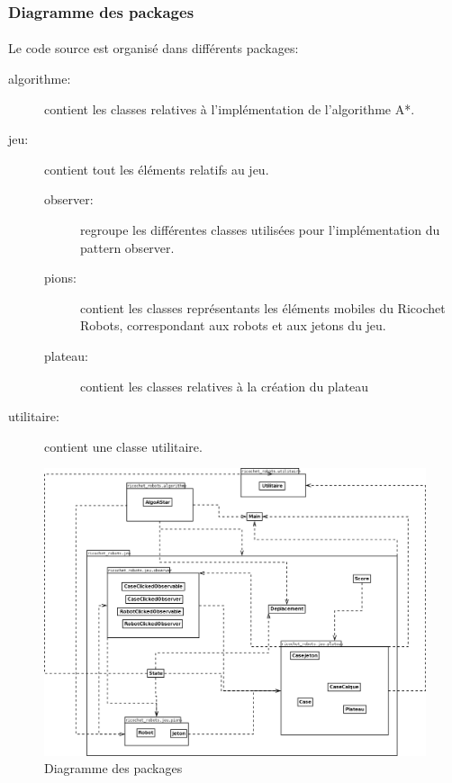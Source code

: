 \documentclass[a4paper, 12pt]{article}
\begin{document}
        \subsubsection{Diagramme des packages}
            
            \paragraph{}
             Le code source est organisé dans différents packages:
             
            \begin{description}
            \item[algorithme:] contient les classes relatives à l'implémentation de l'algorithme A*.
                 \item[jeu:] contient tout les éléments relatifs au jeu.
                 \begin{description}
            	    \item[observer:] regroupe les différentes classes utilisées pour l'implémentation du pattern observer.
            	    \item[pions:] contient les classes représentants les éléments mobiles du Ricochet Robots, correspondant aux robots et aux jetons du jeu.  
            	    \item[plateau:] contient les classes relatives à la création du plateau
        	    \end{description}
                 \item[utilitaire:] contient une classe utilitaire.
             \end{description}
             
            \begin{figure}[H]
                \centering
                \includegraphics[scale=0.3]{images/diagrammePackage.png}
                 \caption{Diagramme des packages}
            \end{figure}
\end{document}
